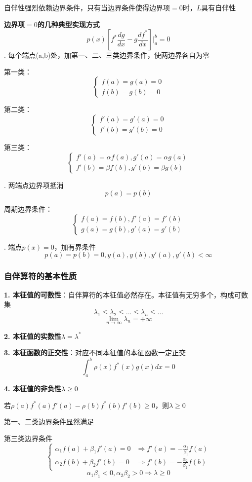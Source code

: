 自伴性强烈依赖边界条件，只有当边界条件使得边界项$=0$时，$L$具有自伴性

\noindent\textbf{边界项$=0$的几种典型实现方式}
$$p(x)\left[f^*\frac{dg}{dx}-g\frac{df^*}{dx}\right]\bigg|_a^b=0$$
. 每个端点(a,b)处，加第一、二、三类边界条件，使两边界各自为零

第一类：$$\begin{cases}
f(a)=g(a)=0\\
f(b)=g(b)=0
\end{cases}$$

第二类：$$\begin{cases}
f'(a)=g'(a)=0\\
f'(b)=g'(b)=0
\end{cases}$$

第三类：$$\begin{cases}
f'(a)=\alpha f(a),g'(a)=\alpha g(a)\\
f'(b)=\beta f(b),g'(b)=\beta g(b)
\end{cases}$$

. 两端点边界项抵消
$$p(a)=p(b)$$

周期边界条件：$$\begin{cases}
f(a)=f(b),f'(a)=f'(b)\\
g(a)=g(b),g'(a)=g'(b)
\end{cases}$$

. 端点$p(x)=0$，加有界条件
  $$p(a)=p(b)=0, y(a),y(b),y'(a),y'(b)<\infty$$

\subsubsection{自伴算符的基本性质}

\noindent\textbf{1. 本征值的可数性}：自伴算符的本征值必然存在。本征值有无穷多个，构成可数集
$$\lambda_1\le\lambda_2\le...\le\lambda_n\le...$$
$$\lim_{n\rightarrow\infty}\lambda_n=+\infty$$

\noindent\textbf{2. 本征值的实数性}$\lambda=\lambda^*$

\noindent\textbf{3. 本征函数的正交性}：对应不同本征值的本征函数一定正交$$\int_a^b\rho(x)f^*(x)g(x)dx=0$$

\noindent\textbf{4. 本征值的非负性}$\lambda\ge0$

若$\rho(a)f^*(a)f'(a)-\rho(b)f^*(b)f'(b)\ge0$，则$\lambda\ge0$

第一、二类边界条件显然满足

第三类边界条件
$$\begin{cases}
\alpha_1f(a)+\beta_1f'(a)=0 &\Rightarrow f'(a)=-\frac{\alpha_1}{\beta_1}f(a)\\
\alpha_2f(b)+\beta_2f'(b)=0 &\Rightarrow f'(b)=-\frac{\alpha_2}{\beta_2}f(b)
\end{cases}$$
$$\alpha_1\beta_1<0,\alpha_2\beta_2>0\Rightarrow\lambda\ge0$$

